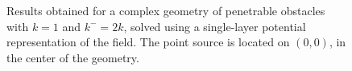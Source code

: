 \begin{figure}
\caption{Results obtained for a complex geometry of penetrable obstacles with $k=1$ and $k^- =2k$, solved using a single-layer potential representation of the field. The point source is located on $(0,0)$, in the center of the geometry.}
\label{fig:exwaveguide}
\end{figure}




